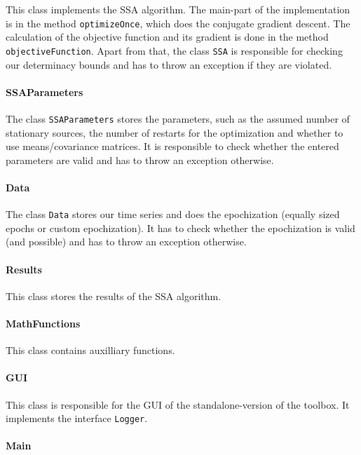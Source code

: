 \documentclass{article}
\newcommand{\1}{\ensuremath{\mathds{1}}}
\newcommand{\0}{\ensuremath{0}}
\begin{document}
This class implements the SSA algorithm. The main-part of the implementation is in the method \texttt{optimizeOnce}, which does
the conjugate gradient descent. The calculation of the objective function and its gradient is done in the method \texttt{objectiveFunction}.
Apart from that, the class \texttt{SSA} is responsible for checking our determinacy bounds and has to throw an exception if they are violated.

\paragraph{SSAParameters}

The class \texttt{SSAParameters} stores the parameters, such as the assumed number of stationary sources, the number of restarts for the optimization and
whether to use means/covariance matrices. It is responsible to check whether the entered parameters are valid and has to throw an exception otherwise.

\paragraph{Data}

The class \texttt{Data} stores our time series and does the epochization (equally sized epochs or custom epochization). It has to check whether the
epochization is valid (and possible) and has to throw an exception otherwise.

\paragraph{Results}

This class stores the results of the SSA algorithm.

\paragraph{MathFunctions}

This class contains auxilliary functions.

\paragraph{GUI}

This class is responsible for the GUI of the standalone-version of the toolbox. It implements the interface \texttt{Logger}.

\paragraph{Main}
\end{document}
